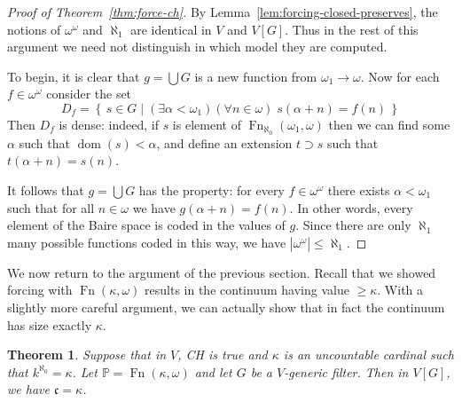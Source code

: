 \documentclass[11pt,oneside]{amsbook}
\newcommand{\set}[1]{\left\{\,#1\,\right\}}
\newcommand{\PP}{\mathbb P}
\DeclareMathOperator{\dom}{dom}
\DeclareMathOperator{\Fn}{Fn}
\theoremstyle{definition}
\theoremstyle{plain}
\newtheorem{thm}{Theorem}[section]
\theoremstyle{definition}
\theoremstyle{remark}
\begin{document}
\begin{proof}[Proof of Theorem~\ref{thm:force-ch}]
  By Lemma~\ref{lem:forcing-closed-preserves}, the notions of $\omega^\omega$ and $\aleph_1$ are identical in $V$ and $V[G]$. Thus in the rest of this argument we need not distinguish in which model they are computed.

  To begin, it is clear that $g=\bigcup G$ is a new function from $\omega_1\to\omega$. Now for each $f\in\omega^\omega$ consider the set
  \[D_f=\set{s\in G\mid (\exists\alpha<\omega_1)(\forall n\in\omega)\;s(\alpha+n)=f(n)}
  \]
  Then $D_f$ is dense: indeed, if $s$ is element of $\Fn_{\aleph_0}(\omega_1,\omega)$ then we can find some $\alpha$ such that $\dom(s)<\alpha$, and define an extension $t\supset s$ such that $t(\alpha+n)=s(n)$.

  It follows that $g=\bigcup G$ has the property: for every $f\in\omega^\omega$ there exists $\alpha<\omega_1$ such that for all $n\in\omega$ we have $g(\alpha+n)=f(n)$. In other words, every element of the Baire space is coded in the values of $g$. Since there are only $\aleph_1$ many possible functions coded in this way, we have $|\omega^\omega|\leq\aleph_1$.
\end{proof}

We now return to the argument of the previous section. Recall that we showed forcing with $\Fn(\kappa,\omega)$ results in the continuum having value $\geq\kappa$. With a slightly more careful argument, we can actually show that in fact the continuum has size exactly $\kappa$.

\begin{thm}
  \label{thm:ch-exact}
  Suppose that in $V$, CH is true and $\kappa$ is an uncountable cardinal such that $k^{\aleph_0}=\kappa$. Let $\PP=\Fn(\kappa,\omega)$ and let $G$ be a $V$-generic filter. Then in $V[G]$, we have $\mathfrak c=\kappa$.
\end{thm}
\end{document}
